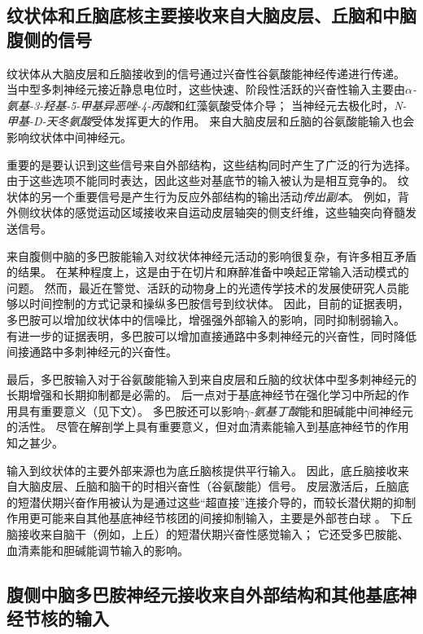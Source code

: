 \subsection{纹状体和丘脑底核主要接收来自大脑皮层、丘脑和中脑腹侧的信号}

纹状体从大脑皮层和丘脑接收到的信号通过兴奋性谷氨酸能神经传递进行传递。
当中型多刺神经元接近静息电位时，这些快速、阶段性活跃的兴奋性输入主要由\textit{$\alpha$-氨基-3-羟基-5-甲基异恶唑-4-丙酸}和红藻氨酸受体介导；
当神经元去极化时，\textit{N-甲基-D-天冬氨酸}受体发挥更大的作用。
来自大脑皮层和丘脑的谷氨酸能输入也会影响纹状体中间神经元。


重要的是要认识到这些信号来自外部结构，这些结构同时产生了广泛的行为选择。
由于这些选项不能同时表达，因此这些对基底节的输入被认为是相互竞争的。
纹状体的另一个重要信号是产生行为反应外部结构的输出活动\textit{传出副本}。
例如，背外侧纹状体的感觉运动区域接收来自运动皮层轴突的侧支纤维，这些轴突向脊髓发送信号。


来自腹侧中脑的多巴胺能输入对纹状体神经元活动的影响很复杂，有许多相互矛盾的结果。
在某种程度上，这是由于在切片和麻醉准备中唤起正常输入活动模式的问题。
然而，最近在警觉、活跃的动物身上的光遗传学技术的发展使研究人员能够以时间控制的方式记录和操纵多巴胺信号到纹状体。
因此，目前的证据表明，多巴胺可以增加纹状体中的信噪比，增强强外部输入的影响，同时抑制弱输入。
有进一步的证据表明，多巴胺可以增加直接通路中多刺神经元的兴奋性，同时降低间接通路中多刺神经元的兴奋性。


最后，多巴胺输入对于谷氨酸能输入到来自皮层和丘脑的纹状体中型多刺神经元的长期增强和长期抑制都是必需的。
后一点对于基底神经节在强化学习中所起的作用具有重要意义（见下文）。
多巴胺还可以影响\textit{$\gamma$-氨基丁酸}能和胆碱能中间神经元的活性。
尽管在解剖学上具有重要意义，但对血清素能输入到基底神经节的作用知之甚少。


输入到纹状体的主要外部来源也为底丘脑核提供平行输入。
因此，底丘脑接收来自大脑皮层、丘脑和脑干的时相兴奋性（谷氨酸能）信号。
皮层激活后，丘脑底的短潜伏期兴奋作用被认为是通过这些“超直接”连接介导的，而较长潜伏期的抑制作用更可能来自其他基底神经节核团的间接抑制输入，主要是外部苍白球 。
下丘脑接收来自脑干（例如，上丘）的短潜伏期兴奋性感觉输入；
它还受多巴胺能、血清素能和胆碱能调节输入的影响。



\subsection{腹侧中脑多巴胺神经元接收来自外部结构和其他基底神经节核的输入}

